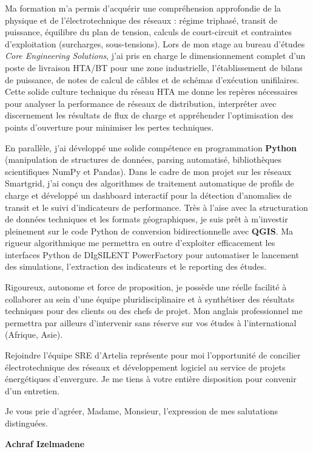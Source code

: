 \documentclass[10pt,a4paper]{altacv}
\begin{document}
\vspace{5pt}

Ma formation m'a permis d'acquérir une compréhension approfondie de la physique et de l'électrotechnique des réseaux : régime triphasé, transit de puissance, équilibre du plan de tension, calculs de court-circuit et contraintes d'exploitation (surcharges, sous-tensions). Lors de mon stage au bureau d'études \textit{Core Engineering Solutions}, j'ai pris en charge le dimensionnement complet d'un poste de livraison HTA/BT pour une zone industrielle, l'établissement de bilans de puissance, de notes de calcul de câbles et de schémas d'exécution unifilaires. Cette solide culture technique du réseau HTA me donne les repères nécessaires pour analyser la performance de réseaux de distribution, interpréter avec discernement les résultats de flux de charge et appréhender l'optimisation des points d'ouverture pour minimiser les pertes techniques.

\vspace{5pt}

En parallèle, j'ai développé une solide compétence en programmation \textbf{Python} (manipulation de structures de données, parsing automatisé, bibliothèques scientifiques NumPy et Pandas). Dans le cadre de mon projet sur les réseaux Smartgrid, j'ai conçu des algorithmes de traitement automatique de profils de charge et développé un dashboard interactif pour la détection d'anomalies de transit et le suivi d'indicateurs de performance. Très à l'aise avec la structuration de données techniques et les formats géographiques, je suis prêt à m'investir pleinement sur le code Python de conversion bidirectionnelle avec \textbf{QGIS}. Ma rigueur algorithmique me permettra en outre d'exploiter efficacement les interfaces Python de DIgSILENT PowerFactory pour automatiser le lancement des simulations, l'extraction des indicateurs et le reporting des études.

\vspace{5pt}

Rigoureux, autonome et force de proposition, je possède une réelle facilité à collaborer au sein d'une équipe pluridisciplinaire et à synthétiser des résultats techniques pour des clients ou des chefs de projet. Mon anglais professionnel me permettra par ailleurs d'intervenir sans réserve sur vos études à l'international (Afrique, Asie).

\vspace{5pt}

Rejoindre l'équipe SRE d'Artelia représente pour moi l'opportunité de concilier électrotechnique des réseaux et développement logiciel au service de projets énergétiques d'envergure. Je me tiens à votre entière disposition pour convenir d'un entretien.

\vspace{5pt}

Je vous prie d'agréer, Madame, Monsieur, l'expression de mes salutations distinguées.

\vspace{12pt}

\begin{flushright}
  \large\color{emphasis}\textbf{Achraf Izelmadene}
\end{flushright}
\end{document}
